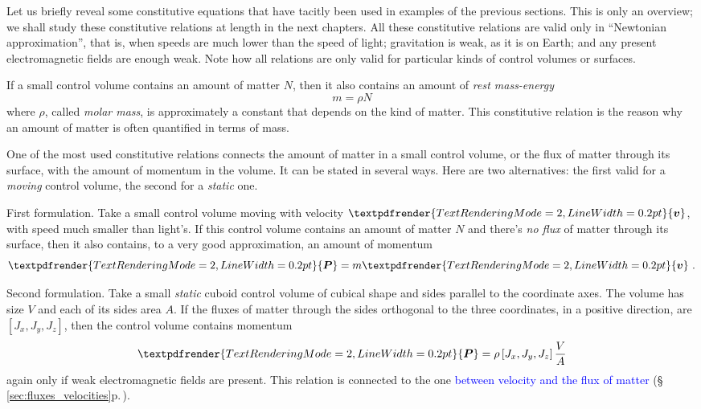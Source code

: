 \documentclass[a4paper,12pt,%
onecolumn,oneside,%
british%
]{memoir}
\renewcommand*{\bm}[1]{\textpdfrender{TextRenderingMode=2,LineWidth=0.2pt}{\boldsymbol{#1}}}
\renewcommand*{\|}[1][]{\nonscript\:#1\vert\nonscript\:\mathopen{}}
\newcommand*{\sect}{\S}%
\renewcommand*{\autoref}[3][\sect\,\ref]{\textcolor{blue}{#3} {\color{blue}\scriptsize(\faIcon[regular]{eye}\;#1{#2}\;p.\,\pageref{#2})}}
\newcommand*{\masse}{mass-energy}
\newcommand*{\yv}{\bm{v}}
\newcommand*{\yN}{N}
\newcommand*{\yrho}{\rho}
\newcommand*{\ym}{m}%
\newcommand*{\yP}{\bm{P}}
\begin{document}
Let us briefly reveal some constitutive equations that have tacitly been used in examples of the previous sections. This is only an overview; we shall study these constitutive relations at length in the next chapters. All these constitutive relations are valid only in \enquote{Newtonian approximation}, that is, when speeds are much lower than the speed of light; gravitation is weak, as it is on Earth; and any present electromagnetic fields are enough weak. Note how all relations are only valid for particular kinds of control volumes or surfaces.

\begin{description}[itemsep=1em,wide]
\item[Constitutive relation for \masse\ and matter.]
If a small control volume contains an amount of matter $\yN$, then it also contains an amount of \emph{rest \masse}
\begin{equation*}
\ym =  \yrho\yN
\end{equation*}
where $\yrho$, called \emph{molar mass}, is approximately a constant that depends on the kind of matter. This constitutive relation is the reason why an amount of matter is often quantified in terms of mass.

\item[Constitutive relation for momentum and matter.]\label{item:momentum_mass_velocity} One of the most used constitutive relations connects the amount of matter in a small control volume, or the flux of matter through its surface, with the amount of momentum in the volume. It can be stated in several ways. Here are two alternatives: the first valid for a \emph{moving} control volume, the second for a \emph{static} one.


  First formulation. Take a small control volume moving with velocity $\yv$, with speed much smaller than light's. If this control volume contains an amount of matter $\yN$ and there's \emph{no flux} of matter through its surface, then it also contains, to a very good approximation, an amount of momentum
\begin{equation*}
  \yP = \ym\yv \ .%
\end{equation*}
%
%

\vspace{-\baselineskip}
Second formulation. Take a small \emph{static} cuboid control volume of cubical shape and sides parallel to the coordinate axes. The volume has size $V$ and each of its sides area $A$. If the fluxes of matter through the sides orthogonal to the three coordinates, in a positive direction, are $[J_{x}, J_{y}, J_{z}]$, then the control volume contains momentum
\begin{equation*}
  \yP = \yrho\,[J_{x}, J_{y}, J_{z}]\,\frac{V}{A}
\end{equation*}
again only if weak electromagnetic fields are present. This relation is connected to the one \autoref{sec:fluxes_velocities}{between velocity and the flux of matter}.



\end{description}
\end{document}
